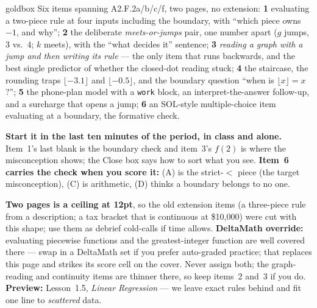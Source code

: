 \documentclass[10pt]{article}
\begin{document}
\boxguard
\begin{skillbox}{goldbox}
Six items spanning A2.F.2a/b/c/f, two pages, no extension: \textbf{1} evaluating a two-piece rule
at four inputs including the boundary, with ``which piece owns $-1$, and why''; \textbf{2} the
deliberate \emph{meets-or-jumps} pair, one number apart ($g$ jumps, $3$ vs.\ $4$; $k$ meets), with
the ``what decides it'' sentence; \textbf{3} \emph{reading a graph with a jump and then writing
its rule} --- the only item that runs backwards, and the best single predictor of whether the
closed-dot reading stuck; \textbf{4} the staircase, the rounding traps $\lfloor-3.1\rfloor$ and
$\lfloor-0.5\rfloor$, and the boundary question ``when is $\lfloor x\rfloor=x$?''; \textbf{5} the
phone-plan model with a \texttt{work} block, an interpret-the-answer follow-up, and a surcharge
that opens a jump; \textbf{6} an SOL-style multiple-choice item evaluating at a boundary, the
formative check.

\textbf{Start it in the last ten minutes of the period, in class and alone.} Item~1's last blank
is the boundary check and item~3's $f(2)$ is where the misconception shows; the Close box says how
to sort what you see. \textbf{Item~6 carries the check when you score it:} (A) is the strict-$<$
piece (the target misconception), (C) is arithmetic, (D) thinks a boundary belongs to no one.

\textbf{Two pages is a ceiling at 12pt}, so the old extension items (a three-piece rule from a
description; a tax bracket that is continuous at \$10{,}000) were cut with this shape; use them
as debrief cold-calls if time allows. \textbf{DeltaMath override:} evaluating piecewise functions
and the greatest-integer function are well covered there --- swap in a DeltaMath set if you
prefer auto-graded practice; that replaces this page and strikes its score cell on the cover.
Never assign both; the graph-reading and continuity items are thinner there, so keep items~2
and~3 if you do. \textbf{Preview:} Lesson~1.5, \emph{Linear Regression} --- we leave exact rules
behind and fit one line to \emph{scattered} data.
\end{skillbox}
\end{document}
